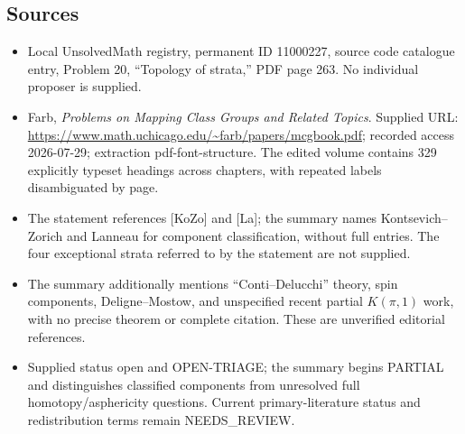 \documentclass[11pt]{article}
\begin{document}
\subsection{Sources}
\begin{itemize}
\item Local UnsolvedMath registry, permanent ID 11000227, source code catalogue entry, Problem 20, ``Topology of strata,'' PDF page 263. No individual proposer is supplied.
\item Farb, \emph{Problems on Mapping Class Groups and Related Topics}. Supplied URL: \url{https://www.math.uchicago.edu/~farb/papers/mcgbook.pdf}; recorded access 2026-07-29; extraction pdf-font-structure. The edited volume contains 329 explicitly typeset headings across chapters, with repeated labels disambiguated by page.
\item The statement references [KoZo] and [La]; the summary names Kontsevich--Zorich and Lanneau for component classification, without full entries. The four exceptional strata referred to by the statement are not supplied.
\item The summary additionally mentions ``Conti--Delucchi'' theory, spin components, Deligne--Mostow, and unspecified recent partial \(K(\pi,1)\) work, with no precise theorem or complete citation. These are unverified editorial references.
\item Supplied status open and OPEN-TRIAGE; the summary begins PARTIAL and distinguishes classified components from unresolved full homotopy/asphericity questions. Current primary-literature status and redistribution terms remain NEEDS\_REVIEW.
\end{itemize}
\end{document}
